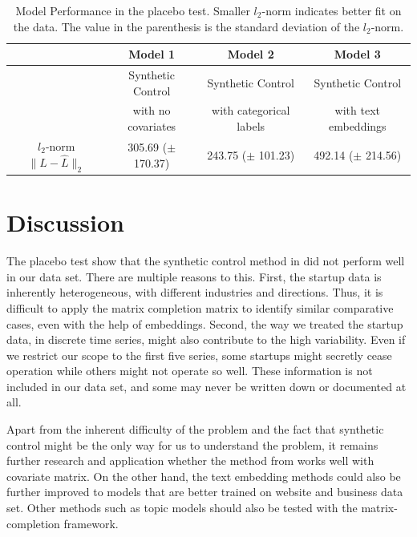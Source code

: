 \documentclass[12pt]{article}
\begin{document}
\begin{table}[]
    \centering
    \begin{tabular}{|c|c|c|c|} \hline
         & \textbf{Model 1} &\textbf{ Model 2 }& \textbf{Model 3}  \\ \hline
         & Synthetic Control  & Synthetic Control  & Synthetic Control \\
         & with no covariates &  with categorical labels & with text embeddings  \\ \hline
         $l_2$-norm $\|L - \hat L\|_2$ & 305.69 ($\pm$ 170.37) & 243.75 ($\pm$ 101.23) & 492.14 ($\pm$ 214.56) \\ \hline
    \end{tabular}
    \caption{Model Performance in the placebo test. Smaller $l_2$-norm indicates better fit on the data. The value in the parenthesis is the standard deviation of the $l_2$-norm. }
    \label{tab:performance}
\end{table}


\section{Discussion}
\label{sec:discuss}
The placebo test show that the synthetic control method in \cite{athey2021matrix} did not perform well in our data set. There are multiple reasons to this. First, the startup data is inherently heterogeneous, with different industries and directions. Thus, it is difficult to apply the matrix completion matrix to identify similar comparative cases, even with the help of embeddings. Second, the way we treated the startup data, in discrete time series, might also contribute to the high variability. Even if we restrict our scope to the first five series, some startups might secretly cease operation while others might not operate so well. These information is not included in our data set, and some may never be written down or documented at all.

Apart from the inherent difficulty of the problem and the fact that synthetic control might be the only way for us to understand the problem, it remains further research and application whether the method from \cite{athey2021matrix} works well with covariate matrix. On the other hand, the text embedding methods could also be further improved to models that are better trained on website and business data set. Other methods such as topic models should also be tested with the matrix-completion framework.
\end{document}
